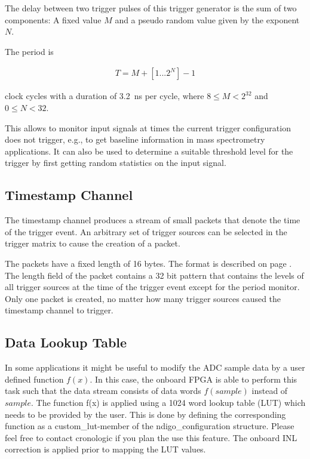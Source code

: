         The delay between two trigger pulses of this trigger generator is the sum of two components: A fixed value $M$ and a pseudo random value given by the exponent $N$. \par

        The period is

        \begin{align}
            T = M + [1...2^N] - 1
        \end{align}

        clock cycles with a duration of 3.2~ns per cycle, where $8 \leq M < 2^{32}$ and $0 \leq N < 32$.\par

        This allows to monitor input signals at times the current trigger configuration does not trigger, e.g., to get baseline information in mass spectrometry applications. It can also be used to determine a suitable threshold level for the trigger by first getting random statistics on the input signal.

    \subsection{Timestamp Channel}

        The timestamp channel produces a stream of small packets that denote the time of the trigger event. An arbitrary set of trigger sources can be selected in the trigger matrix to cause the creation of a packet.\par

        The packets have a fixed length of 16 bytes. The format is described on page \pageref{cp:packetformat}. The length field of the packet contains a 32 bit pattern that contains the levels of all trigger sources at the time of the trigger event except for the period monitor. Only one packet is created, no matter how many trigger sources caused the timestamp channel to trigger.

    \subsection{Data Lookup Table}

        In some applications it might be useful to modify the ADC sample data by a user defined function $f(x)$. In this case, the onboard FPGA is able to perform this task such that the data stream consists of data words $f(sample)$ instead of $sample$. The function f(x) is applied using a 1024 word lookup table (LUT) which needs to be provided by the user. This is done by defining the corresponding function as a custom\_lut-member of the ndigo\_configuration structure. Please feel free to contact cronologic if you plan the use this feature. The onboard INL correction is applied prior to mapping the LUT values.


